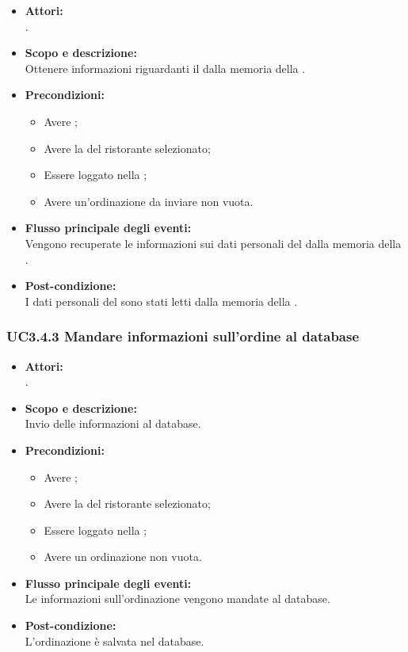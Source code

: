 \begin{itemize}
	\item \textbf{Attori:}
	\\.
	\item \textbf{Scopo e descrizione:} 
	\\Ottenere informazioni riguardanti il  dalla memoria della .
	\item \textbf{Precondizioni:}
	\begin{itemize}
		\item Avere ;
		\item Avere la  del ristorante selezionato;
		\item Essere loggato nella ;
		\item Avere un'ordinazione da inviare non vuota.
	\end{itemize}
	\item \textbf{Flusso principale degli eventi:}
	\\Vengono recuperate le informazioni sui dati personali del  dalla memoria della .
	\item \textbf{Post-condizione:}
	\\I dati personali del  sono stati letti dalla memoria della .
\end{itemize}

\subsubsection{UC3.4.3 Mandare informazioni sull'ordine al database} \label{UC3.4.3}

\begin{itemize}
	\item \textbf{Attori:}
	\\.
	\item \textbf{Scopo e descrizione:} 
	\\Invio delle informazioni al database.
	\item \textbf{Precondizioni:}
	\begin{itemize}
		\item Avere ;
		\item Avere la  del ristorante selezionato;
		\item Essere loggato nella ;
		\item Avere un ordinazione non vuota.
	\end{itemize}
	\item \textbf{Flusso principale degli eventi:}
	\\Le informazioni sull'ordinazione vengono mandate al database.
	\item \textbf{Post-condizione:}
	\\L'ordinazione è salvata nel database.
\end{itemize}

